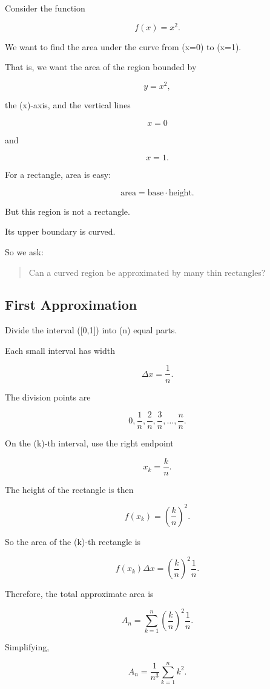 Consider the function

\[
f(x)=x^2.
\]

We want to find the area under the curve from (x=0) to (x=1).

That is, we want the area of the region bounded by

\[
y=x^2,
\]

the (x)-axis, and the vertical lines

\[
x=0
\]

and

\[
x=1.
\]

For a rectangle, area is easy:

\[
\text{area}=\text{base}\cdot\text{height}.
\]

But this region is not a rectangle.

Its upper boundary is curved.

So we ask:

\begin{quote}
Can a curved region be approximated by many thin rectangles?
\end{quote}

\subsection{First Approximation}

Divide the interval ([0,1]) into (n) equal parts.

Each small interval has width

\[
\Delta x=\frac{1}{n}.
\]

The division points are

\[
0,\frac{1}{n},\frac{2}{n},\frac{3}{n},\ldots,\frac{n}{n}.
\]

On the (k)-th interval, use the right endpoint

\[
x_k=\frac{k}{n}.
\]

The height of the rectangle is then

\[
f(x_k)=\left(\frac{k}{n}\right)^2.
\]

So the area of the (k)-th rectangle is

\[
f(x_k)\Delta x = \left(\frac{k}{n}\right)^2\frac{1}{n}.
\]

Therefore, the total approximate area is

\[
A_n=
\sum_{k=1}^{n}
\left(\frac{k}{n}\right)^2\frac{1}{n}.
\]

Simplifying,

\[
A_n=
\frac{1}{n^3}
\sum_{k=1}^{n}k^2.
\]

